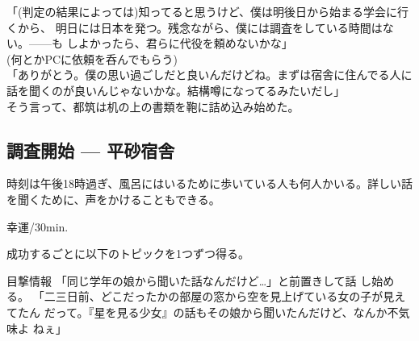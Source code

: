 \documentclass[a4paper,8pt,min]{jsarticle}
\begin{document}
「(判定の結果によっては)知ってると思うけど、僕は明後日から始まる学会に行くから、
明日には日本を発つ。残念ながら、僕には調査をしている時間はない。------も
しよかったら、君らに代役を頼めないかな」\\

(何とかPCに依頼を呑んでもらう)\\

「ありがとう。僕の思い過ごしだと良いんだけどね。まずは宿舎に住んでる人に
話を聞くのが良いんじゃないかな。結構噂になってるみたいだし」\\
そう言って、都筑は机の上の書類を鞄に詰め込み始めた。

\subsection{調査開始 --- 平砂宿舎}
時刻は午後18時過ぎ、風呂にはいるために歩いている人も何人かいる。詳しい話
を聞くために、声をかけることもできる。

\begin{judge}{幸運/30min.}
 \item 成功するごとに以下のトピックを1つずつ得る。
\end{judge}

\begin{topic}
 \item[目撃情報] 「同じ学年の娘から聞いた話なんだけど…」と前置きして話
 し始める。
「二三日前、どこだったかの部屋の窓から空を見上げている女の子が見えてたん
 だって。『星を見る少女』の話もその娘から聞いたんだけど、なんか不気味よ
 ねぇ」

 \item[]
\end{topic}
\end{document}
